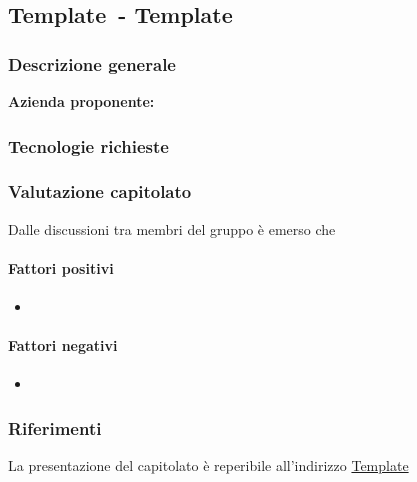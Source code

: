 
\renewcommand{\capName}{Template} %
\renewcommand{\capCode}{Template} %
\renewcommand{\capLink}{Template} %
\renewcommand{\capProposer}{Template} %


\subsection{\capCode\ - \capName}
\subsubsection{Descrizione generale}
\textbf{Azienda proponente:}


\subsubsection{Tecnologie richieste}

\subsubsection{Valutazione capitolato}
Dalle discussioni tra membri del gruppo è emerso che

\paragraph{Fattori positivi}

\begin{itemize}
    \item
\end{itemize}

\paragraph{Fattori negativi}

\begin{itemize}
    \item
\end{itemize}

\subsubsection{Riferimenti}
La presentazione del capitolato è reperibile all'indirizzo \url{\capLink} \hfill{}